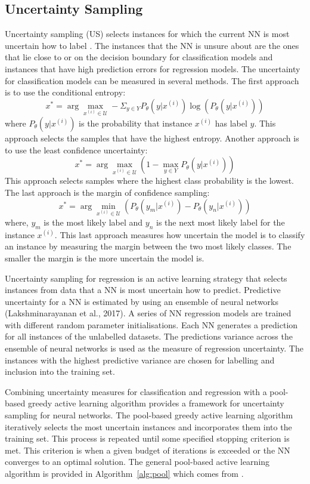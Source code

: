\documentclass[conference]{IEEEtran}
\begin{document}
	\subsection{Uncertainty Sampling}
	Uncertainty sampling (US) selects instances for which the current NN is most uncertain how to label \cite{lewis1994sequential}. The instances that the NN is unsure about are the ones that lie close to or on the decision boundary for classification models and instances that have high prediction errors for regression models. The uncertainty for classification models can be measured in several methods. The first approach is to use the conditional entropy:
	$$
	x^*=\arg \max_{x^{(i)} \in \mathcal{U}} -\Sigma_{y\in Y}P_\theta(y \lvert x^{(i)})\log(P_\theta(y \lvert x^{(i)}))
	$$
	where $P_\theta(y \lvert x^{(i)})$ is the probability that instance $x^{(i)}$ has label $y$. This approach selects the samples that have the highest entropy. 
	Another approach is to use the least confidence uncertainty:
	$$
	x^*=\arg \max_{x^{(i)} \in \mathcal{U}} (1-\max_{y\in Y}P_\theta(y \lvert x^{(i)}))
	$$
	This approach selects samples where the highest class probability is the lowest.
	The last approach is the margin of confidence sampling:
	$$
	x^*=\arg \min_{x^{(i)} \in \mathcal{U}} (P_\theta(y_m \lvert x^{(i)}) - P_\theta(y_n \lvert x^{(i)}))
	$$
	where, $y_m$ is the most likely label and $y_n$ is the next most likely label for the instance $x^{(i)}$. This last approach measures how uncertain the model is to classify an instance by measuring the margin between the two most likely classes. The smaller the margin is the more uncertain the model is.
	
	Uncertainty sampling for regression is an active learning strategy that selects instances from data that a NN is most uncertain how to predict. Predictive uncertainty for a NN is estimated by using an ensemble of neural networks (Lakshminarayanan et al., 2017). A series of NN regression models are trained with different random parameter initialisations. Each NN generates a prediction for all instances of the unlabelled datasets. The predictions variance across the ensemble of neural networks is used as the measure of regression uncertainty. The instances with the highest predictive variance are chosen for labelling and inclusion into the training set.
	
	Combining uncertainty measures for classification and regression with a pool-based greedy active learning algorithm provides a framework for uncertainty sampling for neural networks. The pool-based greedy active learning algorithm iteratively selects the most uncertain instances and incorporates them into the training set. This process is repeated until some specified stopping criterion is met. This criterion is when a given budget of iterations is exceeded or the NN converges to an optimal solution. The general pool-based active learning algorithm is provided in Algorithm~\ref{alg:pool} which comes from \cite{sharma2017}.
	
\end{document}
